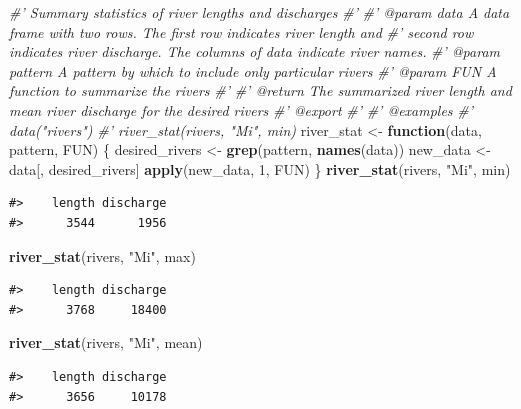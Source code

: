 \documentclass[
]{book}
\newenvironment{Shaded}{\begin{snugshade}}{\end{snugshade}}
\newcommand{\CommentTok}[1]{\textcolor[rgb]{0.56,0.35,0.01}{\textit{#1}}}
\newcommand{\ControlFlowTok}[1]{\textcolor[rgb]{0.13,0.29,0.53}{\textbf{#1}}}
\newcommand{\DecValTok}[1]{\textcolor[rgb]{0.00,0.00,0.81}{#1}}
\newcommand{\KeywordTok}[1]{\textcolor[rgb]{0.13,0.29,0.53}{\textbf{#1}}}
\newcommand{\NormalTok}[1]{#1}
\newcommand{\StringTok}[1]{\textcolor[rgb]{0.31,0.60,0.02}{#1}}
\begin{document}
\begin{Shaded}
\begin{Highlighting}[]
\CommentTok{#' Summary statistics of river lengths and discharges}
\CommentTok{#'}
\CommentTok{#' @param data A data frame with two rows. The first row indicates river length and}
\CommentTok{#'   second row indicates river discharge. The columns of data indicate river names.}
\CommentTok{#' @param pattern A pattern by which to include only particular rivers}
\CommentTok{#' @param FUN A function to summarize the rivers}
\CommentTok{#'}
\CommentTok{#' @return The summarized river length and mean river discharge for the desired rivers}
\CommentTok{#' @export}
\CommentTok{#'}
\CommentTok{#' @examples}
\CommentTok{#' data("rivers")}
\CommentTok{#' river_stat(rivers, "Mi", min)}
\NormalTok{river_stat <-}\StringTok{ }\ControlFlowTok{function}\NormalTok{(data, pattern, FUN) \{}
\NormalTok{  desired_rivers <-}\StringTok{ }\KeywordTok{grep}\NormalTok{(pattern, }\KeywordTok{names}\NormalTok{(data))}
\NormalTok{  new_data <-}\StringTok{ }\NormalTok{data[, desired_rivers]}
  \KeywordTok{apply}\NormalTok{(new_data, }\DecValTok{1}\NormalTok{, FUN)}
\NormalTok{\}}
\KeywordTok{river_stat}\NormalTok{(rivers, }\StringTok{"Mi"}\NormalTok{, min)}
\end{Highlighting}
\end{Shaded}

\begin{verbatim}
#>    length discharge 
#>      3544      1956
\end{verbatim}

\begin{Shaded}
\begin{Highlighting}[]
\KeywordTok{river_stat}\NormalTok{(rivers, }\StringTok{"Mi"}\NormalTok{, max)}
\end{Highlighting}
\end{Shaded}

\begin{verbatim}
#>    length discharge 
#>      3768     18400
\end{verbatim}

\begin{Shaded}
\begin{Highlighting}[]
\KeywordTok{river_stat}\NormalTok{(rivers, }\StringTok{"Mi"}\NormalTok{, mean)}
\end{Highlighting}
\end{Shaded}

\begin{verbatim}
#>    length discharge 
#>      3656     10178
\end{verbatim}
\end{document}
